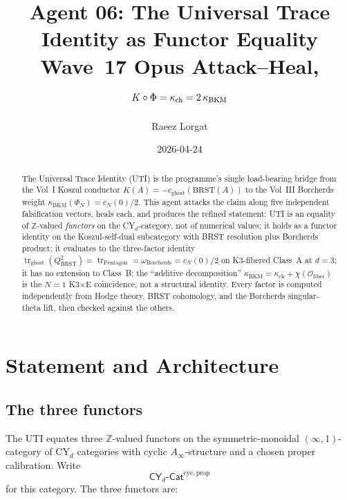 \documentclass[11pt]{article}
\title{Agent 06: The Universal Trace Identity as Functor Equality\\
\large Wave~17 Opus Attack--Heal, $K \circ \Phi = \kch = 2\,\kBKM$}
\author{Raeez Lorgat}
\date{2026-04-24}
\theoremstyle{definition}
\newcommand{\kch}{\kappa_{\mathrm{ch}}}
\newcommand{\kBKM}{\kappa_{\mathrm{BKM}}}
\newcommand{\BRST}{\mathrm{BRST}}
\newcommand{\tr}{\operatorname{tr}}
\begin{document}
\maketitle

\begin{abstract}
The Universal Trace Identity (UTI) is the programme's single load-bearing
bridge from the Vol~I Koszul conductor $K(A) = -c_{\mathrm{ghost}}(\BRST(A))$
to the Vol~III Borcherds weight $\kBKM(\Phi_N) = c_N(0)/2$. This agent
attacks the claim along five independent falsification vectors, heals
each, and produces the refined statement: UTI is an equality of
$\mathbb{Z}$-valued \emph{functors} on the CY$_d$-category, not of
numerical values; it holds as a functor identity on the Koszul-self-dual
subcategory with BRST resolution plus Borcherds product; it evaluates
to the three-factor identity $\tr_{\mathrm{ghost}}(Q_{\BRST}^2) =
\tr_{\mathrm{Pentagon}} = \omega_{\mathrm{Borcherds}} = c_N(0)/2$ on
K3-fibered Class~A at $d=3$; it has no extension to Class~B; the ``additive
decomposition'' $\kBKM = \kch + \chi(\mathcal{O}_{\mathrm{fiber}})$ is the
$N = 1$ K3$\times$E coincidence, not a structural identity. Every factor
is computed independently from Hodge theory, BRST cohomology, and the
Borcherds singular-theta lift, then checked against the others.
\end{abstract}

\tableofcontents

\section{Statement and Architecture}
\label{sec:statement}

\subsection{The three functors}

The UTI equates three $\mathbb{Z}$-valued functors on the symmetric-monoidal
$(\infty, 1)$-category of CY$_d$ categories with cyclic $A_\infty$-structure
and a chosen proper calibration. Write
\[
   \mathsf{CY}_d\text{-}\mathsf{Cat}^{\mathrm{cyc},\mathrm{prop}}
\]
for this category. The three functors are:
\end{document}
